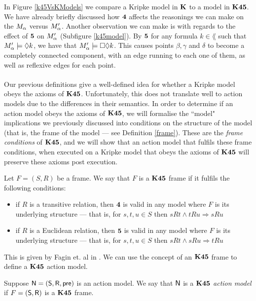 In Figure \ref{k45VsKModels} we compare a Kripke model in $\bf K$ to a model in $\bf K45$.
We have already briefly discussed how $\bf 4$ affects the reasonings we can make on the $M_\alpha$ versus
$M'_\alpha$.
Another observation we can make is with regards to the effect of $\bf 5$ on $M'_\alpha$ (Subfigure
\ref{k45model}).
By $\bf 5$ for any formula $k \in \lang$ such that $M'_\alpha \models
\Diamond k$, we have that $M'_\alpha \models \Box \Diamond k$.
This causes points $\beta, \gamma$ and $\delta$ to become a completely connected component,
with an edge running to each one of them, as well as reflexive edges for each point.\\
\\
Our previous definitions give a well-defined idea for whether a Kripke model obeys the axioms of $\bf K45$.
Unfortunately, this does not translate well to action models due to the differences in their
semantics.
In order to determine if an action model obeys the axioms of $\bf K45$, we will formalise the ``model"
implications we previously discussed into conditions on the structure of the model (that is, the
frame of the model --- see Definition \ref{frame}).
These are the {\em frame conditions} of $\bf K45$, and we will show that an action model that fulfils these
frame conditions, when executed on a Kripke model that obeys the axioms of $\bf K45$ will preserve
these axioms post execution.

\begin{defn} \label{lemma:k45frameconditions}
	Let $F = (S,R)$ be a frame.
	We say that $F$ is a $\bf K45$ frame if it fulfils the following conditions:
	\begin{itemize}
		\item if $R$ is a transitive relation, then $\bf 4$ is valid in any model where $F$ is its
			underlying structure --- that is, for $s, t, u \in S$ then $s R t \land t R u \Rightarrow s R u$
		\item if $R$ is a Euclidean relation, then $\bf 5$ is valid in any model where $F$ is its
			underlying structure --- that is, for $s, t, u \in S$ then $s R t \land s R u \Rightarrow t R u$
	\end{itemize}
\end{defn}

This is given by Fagin et. al in \cite{fagin1995reasoning}.
We can use the concept of an $\bf K45$ frame to define a $\bf K45$ action model.

\begin{defn} \label{defn:k45eventModel}
	Suppose $\mathrm{\mathsf{N}} = (\mathrm{\mathsf{S}}, \mathrm{\mathsf{R}}, \mathrm{\mathsf{pre}})$ is an action model.
	We say that $\mathrm{\mathsf{N}}$ is a {\em $\bf K45$ action model} if $F = (\mathrm{\mathsf{S}}, \mathrm{\mathsf{R}})$ is a $\bf K45$ frame.
\end{defn}

